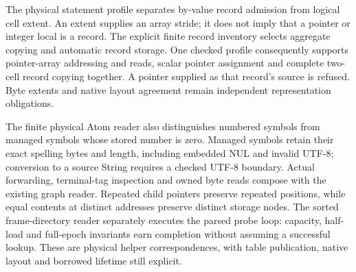 \documentclass[11pt,a4paper]{article}
\begin{document}
The physical statement profile separates by-value record admission from
logical cell extent. An extent supplies an array stride; it does not imply
that a pointer or integer local is a record. The explicit finite record
inventory selects aggregate copying and automatic record storage. One checked
profile consequently supports pointer-array addressing and reads, scalar
pointer assignment and complete two-cell record copying together. A pointer
supplied as that record's source is refused. Byte extents and native layout
agreement remain independent representation obligations.

The finite physical Atom reader also distinguishes numbered symbols from
managed symbols whose stored number is zero. Managed symbols retain their
exact spelling bytes and length, including embedded NUL and invalid UTF-8;
conversion to a source String requires a checked UTF-8 boundary. Actual
forwarding, terminal-tag inspection and owned byte reads compose with the
existing graph reader. Repeated child pointers preserve repeated positions,
while equal contents at distinct addresses preserve distinct storage nodes.
The sorted frame-directory reader separately executes the parsed probe loop:
capacity, half-load and full-epoch invariants earn completion without assuming
a successful lookup. These are physical helper correspondences, with table
publication, native layout and borrowed lifetime still explicit.
\end{document}
